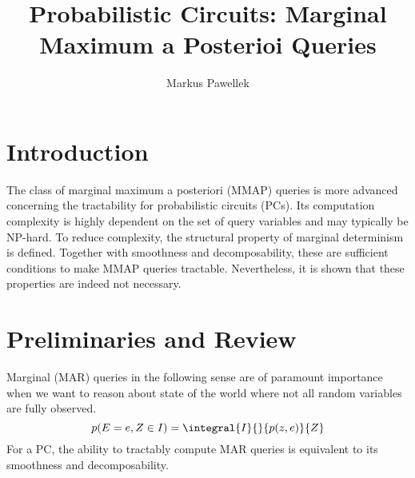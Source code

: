 \documentclass[9pt,fleqn,twoside,twocolumn]{stdglobal}
\title{%
  Probabilistic Circuits: Marginal Maximum a Posterioi Queries
}
\author{Markus Pawellek}
\begin{document}
\thispagestyle{sectionstyle}



\section{Introduction}
  The class of marginal maximum a posteriori (MMAP) queries is more advanced concerning the tractability for probabilistic circuits (PCs).
  Its computation complexity is highly dependent on the set of query variables and may typically be NP-hard.
  To reduce complexity, the structural property of marginal determinism is defined.
  Together with smoothness and decomposability, these are sufficient conditions to make MMAP queries tractable.
  Nevertheless, it is shown that these properties are indeed not necessary.

\section{Preliminaries and Review}
  Marginal (MAR) queries in the following sense are of paramount importance when we want to reason about state of the world where not all random variables are fully observed.
  \[
    p(E=e, Z\in I) = \integral{I}{}{p(z,e)}{Z}
  \]
  For a PC, the ability to tractably compute MAR queries is equivalent to its smoothness and decomposability.
\end{document}
